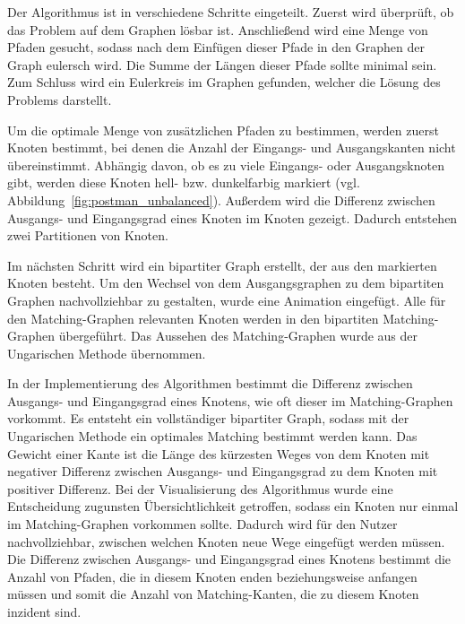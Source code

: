 Der Algorithmus ist in verschiedene Schritte eingeteilt. Zuerst wird überprüft, ob das Problem auf dem Graphen lösbar ist. Anschließend wird eine Menge von Pfaden gesucht, sodass nach dem Einfügen dieser Pfade in den Graphen der Graph eulersch wird. Die Summe der Längen dieser Pfade sollte minimal sein.
Zum Schluss wird ein Eulerkreis im Graphen gefunden, welcher die Lösung des Problems darstellt.

Um die optimale Menge von zusätzlichen Pfaden zu bestimmen, werden zuerst Knoten bestimmt, bei denen die Anzahl der Eingangs- und Ausgangskanten nicht übereinstimmt.
Abhängig davon, ob es zu viele Eingangs- oder Ausgangsknoten gibt, werden diese Knoten hell- bzw. dunkelfarbig markiert (vgl. Abbildung~\ref{fig:postman_unbalanced}). Außerdem wird die Differenz zwischen Ausgangs- und Eingangsgrad eines Knoten im Knoten gezeigt. Dadurch entstehen zwei Partitionen von Knoten. 

Im nächsten Schritt wird ein bipartiter Graph erstellt, der aus den markierten Knoten besteht. Um den Wechsel von dem Ausgangsgraphen zu dem bipartiten Graphen nachvollziehbar zu gestalten, wurde eine Animation eingefügt. Alle für den Matching-Graphen relevanten Knoten werden in den bipartiten Matching-Graphen übergeführt. Das Aussehen des Matching-Graphen wurde aus der Ungarischen Methode übernommen. 

In der Implementierung des Algorithmen bestimmt die Differenz zwischen Ausgangs- und Eingangsgrad eines Knotens, wie oft dieser im Matching-Graphen vorkommt. Es entsteht ein vollständiger bipartiter Graph, sodass mit der Ungarischen Methode ein optimales Matching bestimmt werden kann. Das Gewicht einer Kante ist die Länge des kürzesten Weges von dem Knoten mit negativer Differenz zwischen Ausgangs- und Eingangsgrad zu dem Knoten mit positiver Differenz. Bei der Visualisierung des Algorithmus wurde eine Entscheidung zugunsten Übersichtlichkeit getroffen, sodass ein Knoten nur einmal im Matching-Graphen vorkommen sollte. Dadurch wird für den Nutzer nachvollziehbar, zwischen welchen Knoten neue Wege eingefügt werden müssen. Die Differenz zwischen Ausgangs- und Eingangsgrad eines Knotens bestimmt die Anzahl von Pfaden, die in diesem Knoten enden beziehungsweise anfangen müssen und somit die Anzahl von Matching-Kanten, die zu diesem Knoten inzident sind.

